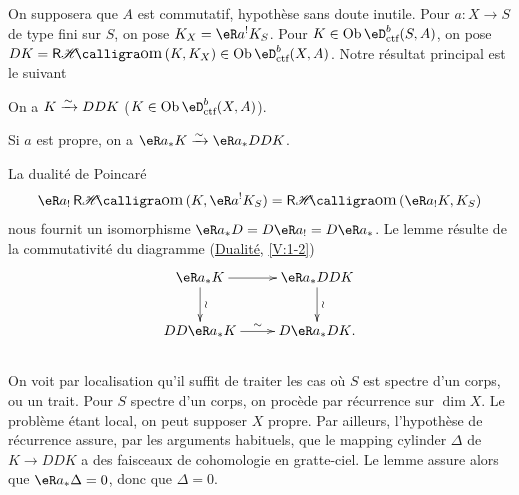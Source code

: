 \subsection{}\label{VII:4-2}

On supposera que $A$ est commutatif, hypothèse sans doute inutile. Pour 
$a:X\to S$ de type fini sur $S$, on pose $K_X=\eR a^! K_S$. Pour 
$K\in\ob\eD_\text{ctf}^b(S,A)$, on pose 
$D K=\rHom(K,K_X)\in\ob\eD_\text{ctf}^b(X,A)$. Notre résultat principal est 
le suivant 





\begin{theorem_}\label{VII:4-3}
On a $K\xrightarrow\sim D D K$ ($K\in \ob\eD_\textnormal{ctf}^b(X,A)$). 
\end{theorem_}





\begin{lemma_}\label{VII:4-4}
Si $a$ est propre, on a $\eR a_\ast K \iso \eR a_\ast D D K$. 
\end{lemma_}

La dualité de Poincaré 
\[
  \eR a_! \rHom(K,\eR a^! K_S) = \rHom(\eR a_! K,K_S) 
\]
nous fournit un isomorphisme $\eR a_\ast D = D \eR a_! = D \eR a_\ast$. Le 
lemme résulte de la commutativité du diagramme (\hyperref[V]{Dualité}, 
\ref{V:1-2}) 
\[\xymatrix{
  \eR a_\ast K \ar[r] \ar[d]^-\wr 
    & \eR a_\ast D D K \ar[d]^-\wr \\
  D D \eR a_\ast K \ar[r]^-\sim 
    & D \eR a_\ast D K \text{.} 
}\]





\subsection{}\label{VII:4-5}

On voit par localisation qu'il suffit de traiter les cas où $S$ est spectre 
d'un corps, ou un trait. Pour $S$ spectre d'un corps, on procède par 
récurrence sur $\dim X$. Le problème étant local, on peut supposer $X$ 
propre. Par ailleurs, l'hypothèse de récurrence assure, par les arguments 
habituels, que le mapping cylinder $\Delta$ de $K\to D D K$ a des faisceaux de 
cohomologie en gratte-ciel. Le lemme assure alors que $\eR a_\ast \Delta=0$, 
donc que $\Delta=0$. 





\subsection{}\label{VII:4-6}

